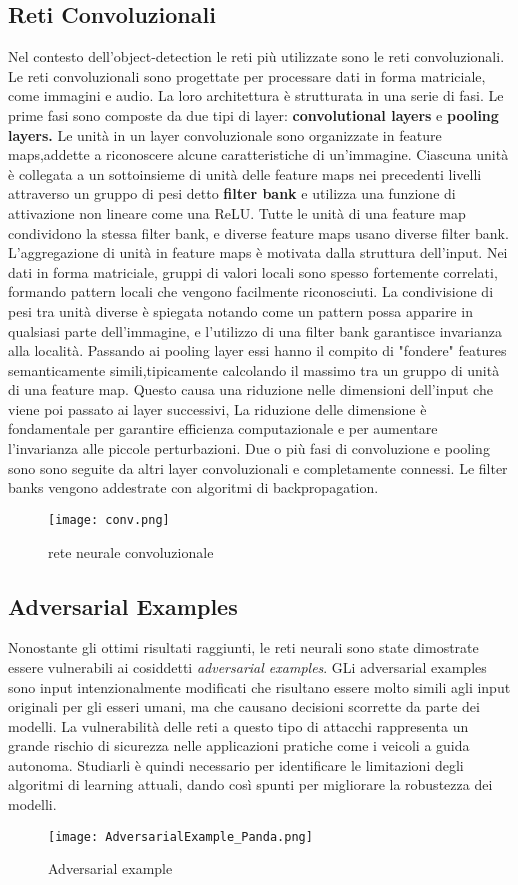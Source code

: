 \subsection{Reti Convoluzionali}
Nel contesto dell'object-detection le reti più utilizzate sono le reti convoluzionali. Le reti convoluzionali sono  progettate per processare dati in forma 
matriciale, come immagini e audio. La loro architettura è strutturata in una serie di fasi. Le prime fasi sono composte da due tipi di layer: \textbf{convolutional layers}
e \textbf{pooling layers.}
Le unità in un layer convoluzionale sono organizzate in feature maps,addette a riconoscere alcune caratteristiche di un'immagine. Ciascuna unità è collegata
a un sottoinsieme di unità delle feature maps nei precedenti livelli attraverso un gruppo di pesi detto \textbf{filter bank} e utilizza una funzione di attivazione non lineare come una ReLU. Tutte le unità di una feature map condividono 
la stessa filter bank, e diverse feature maps usano diverse filter bank. L'aggregazione di unità in feature maps è motivata dalla struttura dell'input. Nei dati in forma matriciale, gruppi di valori locali sono spesso fortemente correlati,
formando pattern locali che vengono facilmente riconosciuti. La condivisione di pesi tra unità  diverse è spiegata notando come un pattern possa apparire in qualsiasi parte dell'immagine, e l'utilizzo di una filter bank garantisce invarianza alla località.
Passando ai pooling layer essi hanno il compito di "fondere" features semanticamente simili,tipicamente calcolando il massimo tra un gruppo di unità di una feature map. Questo causa una riduzione nelle dimensioni dell'input che viene poi passato
ai layer successivi, La riduzione delle dimensione è fondamentale per garantire efficienza computazionale e per aumentare l'invarianza alle piccole perturbazioni.
Due o più fasi di convoluzione e pooling sono  sono seguite da altri layer convoluzionali e completamente connessi. Le filter banks vengono addestrate con algoritmi di backpropagation.\cite{deep}
\begin{figure}[h]
  \texttt{[image: conv.png]}
  \caption{rete neurale convoluzionale}
  \label{fig:conv}
\end{figure} 

\subsection{Adversarial Examples}
Nonostante gli ottimi risultati raggiunti, le reti neurali sono state dimostrate essere vulnerabili ai cosiddetti \emph{adversarial examples}. GLi adversarial
examples sono input intenzionalmente modificati che risultano essere molto simili agli input originali per gli esseri umani, ma che causano decisioni scorrette
da parte dei modelli. La vulnerabilità delle reti a questo tipo di attacchi rappresenta un grande rischio di sicurezza nelle applicazioni pratiche come i veicoli a guida autonoma. Studiarli
è quindi necessario per identificare le limitazioni degli algoritmi di learning attuali, dando così spunti per migliorare la robustezza dei modelli.

\begin{figure}[h]
  \texttt{[image: AdversarialExample\_Panda.png]}
  \caption{Adversarial example}
  \label{fig:adv}
\end{figure}

    